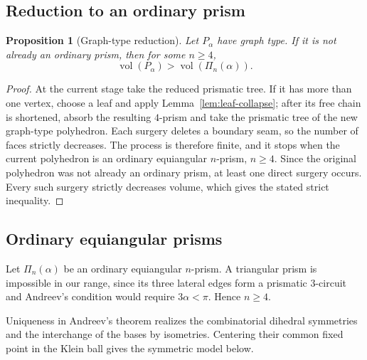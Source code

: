\documentclass[12pt,a4paper]{article}
\newtheorem{proposition}[theorem]{Proposition}
\theoremstyle{definition}
\DeclareMathOperator{\Vol}{vol}
\begin{document}
\subsection{Reduction to an ordinary prism}

\begin{proposition}[Graph-type reduction]\label{prop:graph-surgery-reduction}
Let \(P_\alpha\) have graph type.  If it is not already an ordinary prism, then
for some \(n\ge4\),
\[
        \Vol(P_\alpha)>\Vol(\Pi_n(\alpha)).
\]
\end{proposition}

\begin{proof}
At the current stage take the reduced prismatic tree.  If it has more than
one vertex, choose a leaf and apply Lemma~\ref{lem:leaf-collapse}; after its
free chain is shortened, absorb the resulting \(4\)-prism and take the
prismatic tree of the new graph-type polyhedron. Each surgery deletes a boundary seam,
so the number of faces strictly decreases.  The process is therefore finite,
and it stops when the current polyhedron is an ordinary equiangular
\(n\)-prism, \(n\ge4\).  Since the original polyhedron was not already an
ordinary prism, at least one direct surgery occurs.  Every such surgery
strictly decreases volume, which gives the stated strict inequality.
\end{proof}

\subsection{Ordinary equiangular prisms}

Let \(\Pi_n(\alpha)\) be an ordinary equiangular \(n\)-prism. A triangular
prism is impossible in our range, since its three lateral edges form a
prismatic \(3\)-circuit and Andreev's condition would require
\(3\alpha<\pi\). Hence \(n\ge4\).

Uniqueness in Andreev's theorem realizes the combinatorial dihedral
symmetries and the interchange of the bases by isometries. Centering their
common fixed point in the Klein ball gives the symmetric model below.
\end{document}
